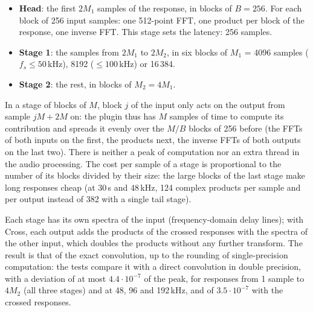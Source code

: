 \documentclass[a4paper,11pt]{article}
\begin{document}
\begin{itemize}
\item \textbf{Head}: the first $2M_1$ samples of the response, in blocks of $B = 256$. For each
  block of 256 input samples: one 512-point FFT, one product per block of the response, one inverse
  FFT. This stage sets the latency: 256 samples.
\item \textbf{Stage 1}: the samples from $2M_1$ to $2M_2$, in six blocks of $M_1$ = 4096 samples
  ($f_s \leq 50$\,kHz), 8192 ($\leq 100$\,kHz) or 16\,384.
\item \textbf{Stage 2}: the rest, in blocks of $M_2 = 4 M_1$.
\end{itemize}
In a stage of blocks of $M$, block $j$ of the input only acts on the output from sample $jM + 2M$
on: the plugin thus has $M$ samples of time to compute its contribution and spreads it evenly over
the $M/B$ blocks of 256 before (the FFTs of both inputs on the first, the products next, the inverse
FFTs of both outputs on the last two). There is neither a peak of computation nor an extra thread
in the audio processing. The cost per sample of a stage is proportional to the number of its
blocks divided by their size: the large blocks of the last stage make long responses cheap (at
30\,s and 48\,kHz, 124 complex products per sample and per output instead of 382 with a single tail
stage).

Each stage has its own spectra of the input (frequency-domain delay lines); with Cross, each output
adds the products of the crossed responses with the spectra of the other input, which doubles the
products without any further transform. The result is that of the exact convolution, up to the
rounding of single-precision computation: the tests compare it with a direct convolution in double
precision, with a deviation of at most $4.4 \cdot 10^{-7}$ of the peak, for responses from 1 sample
to $4M_2$ (all three stages) and at 48, 96 and 192\,kHz, and of $3.5 \cdot 10^{-7}$ with the
crossed responses.
\end{document}
